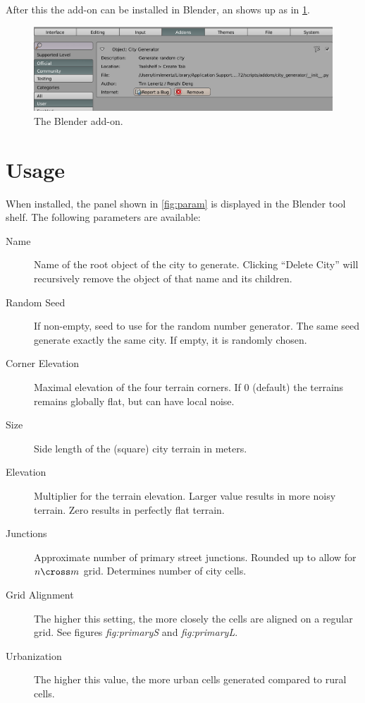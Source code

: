 \documentclass[a4paper,12pt]{scrartcl}
\begin{document}
After this the add-on can be installed in Blender, an shows up as in \ref{fig:addon}.

\begin{figure}[h]
\center
\includegraphics[width=\textwidth]{addon.png}
\caption{The Blender add-on.}
\label{fig:addon}
\end{figure}


\section{Usage}
When installed, the panel shown in \ref{fig:param} is displayed in the Blender tool shelf. The following parameters are available:
\begin{description}
\item[Name] Name of the root object of the city to generate. Clicking ``Delete City'' will recursively remove the object of that name and its children.
\item[Random Seed] If non-empty, seed to use for the random number generator. The same seed generate exactly the same city. If empty, it is randomly chosen.
\item[Corner Elevation] Maximal elevation of the four terrain corners. If 0 (default) the terrains remains globally flat, but can have local noise.
\item[Size] Side length of the (square) city terrain in meters.
\item[Elevation] Multiplier for the terrain elevation. Larger value results in more noisy terrain. Zero results in perfectly flat terrain.
\item[Junctions] Approximate number of primary street junctions. Rounded up to allow for $n \cross m$ grid. Determines number of city cells.
\item[Grid Alignment] The higher this setting, the more closely the cells are aligned on a regular grid. See figures \emph{fig:primaryS} and \emph{fig:primaryL}.
\item[Urbanization] The higher this value, the more urban cells generated compared to rural cells.
\end{description}
\end{document}
